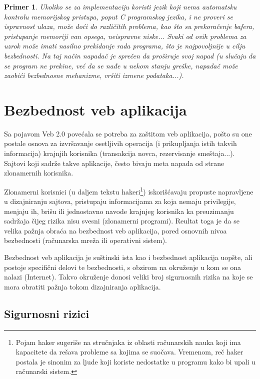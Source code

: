 \documentclass[a4paper]{article}
\newtheorem{primer}{Primer}[section]
\begin{document}
\begin{primer}
	\label{primer5}
	Ukoliko se za implementaciju koristi jezik koji nema automatsku kontrolu memorijskog pristupa, poput C programskog jezika, i ne proveri se ispravnost ulaza, može doći do različitih problema, kao što su prekoračenje bafera, pristupanje memoriji van opsega, neispravne niske... Svaki od ovih problema za uzrok može imati nasilno prekidanje rada programa, što je najpovoljnije u cilju bezbednosti. Na taj način napadač je sprečen da proširuje svoj napad (u slučaju da se program ne prekine, već da se nađe u nekom stanju greške, napadač može zaobići bezbednosne mehanizme, vršiti izmene podataka...).
\end{primer}

\section{Bezbednost veb aplikacija} \label{aplikacije}

Sa pojavom Veb 2.0 \cite{VEB} povećala se potreba za zaštitom veb aplikacija, pošto su one postale osnova za izvršavanje osetljivih operacija  (i prikupljanja istih takvih informacija) krajnjih korisnika (transakcija novca, rezervisanje smeštaja...). Sajtovi koji sadrže takve aplikacije, često bivaju meta napada od strane zlonamernih korisnika.

Zlonamerni korisnici (u daljem tekstu hakeri\footnote{Pojam haker sugeriše na stručnjaka iz oblasti računarskih nauka koji ima kapacitete da rešava probleme sa kojima se suočava. Vremenom, reč haker postala je sinonim za ljude koji koriste nedostatke u programu kako bi upali u računarski sistem.}) iskorišćavaju propuste napravljene u dizajniranju sajtova, pristupaju informacijama za koja nemaju privilegije, menjaju ih, brišu ili jednostavno navode krajnjeg korisnika ka preuzimanju sadržaja čijeg rizika nisu svesni (zlonamerni programi). Reultat toga je da se velika pažnja obraća na bezbednost veb aplikacija, pored osnovnih nivoa bezbednosti (računarska mreža ili operativni sistem).

Bezbednost veb aplikacija je suštinski ista kao i bezbednost aplikacija uopšte, ali postoje specifični delovi te bezbednosti, s obzirom na okruženje u kom se ona nalazi (Internet). Takvo okruženje donosi veliki broj sigurnosnih rizika na koje se mora obratiti pažnja tokom dizajniranja aplikacija.

\subsection{Sigurnosni rizici}
\end{document}
